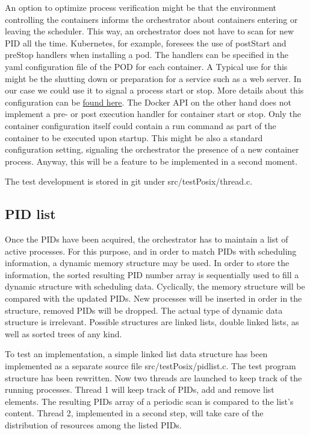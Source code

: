 \documentclass[]{scrartcl}
\begin{document}
An option to optimize process verification might be that the environment controlling the containers informs the orchestrator about containers entering or leaving the scheduler.
This way, an orchestrator does not have to scan for new PID all the time.
Kubernetes, for example, foresees the use of postStart and preStop handlers when installing a pod. 
The handlers can be specified in the yaml configuration file of the POD for each container. A Typical use for this might be the shutting down or preparation for a service such as a web server. 
In our case we could use it to signal a process start or stop.
More details about this configuration can be \href{{https://kubernetes.io/docs/tasks/configure-pod-container/attach-handler-lifecycle-event/}}{found here}.
The Docker API on the other hand does not implement a pre- or post execution handler for container start or stop. 
Only the container configuration itself could contain a run command as part of the container to be executed upon startup. This might be also a standard configuration setting, signaling the orchestrator the presence of a new container process.
Anyway, this will be a feature to be implemented in a second moment.

The test development is stored in git under {src/testPosix/thread.c}.

\subsection{PID list}

Once the PIDs have been acquired, the orchestrator has to maintain a list of active processes. 
For this purpose, and in order to match PIDs with scheduling information, a dynamic memory structure may be used.
In order to store the information, the sorted resulting PID number array is sequentially used to fill a dynamic structure with scheduling data. 
Cyclically, the memory structure will be compared with the updated PIDs. New processes will be inserted in order in the structure, removed PIDs will be dropped.
The actual type of dynamic data structure is irrelevant. Possible structures are linked lists, double linked lists, as well as sorted trees of any kind.

To test an implementation, a simple linked list data structure has been implemented as a separate source file {src/testPosix/pidlist.c}.
The test program structure has been rewritten. Now two threads are launched to keep track of the running processes. 
Thread 1 will keep track of PIDs, add and remove list elements. The resulting PIDs array of a periodic scan is compared to the list's content.
Thread 2, implemented in a second step, will take care of the distribution of resources among the listed PIDs. 
\end{document}
